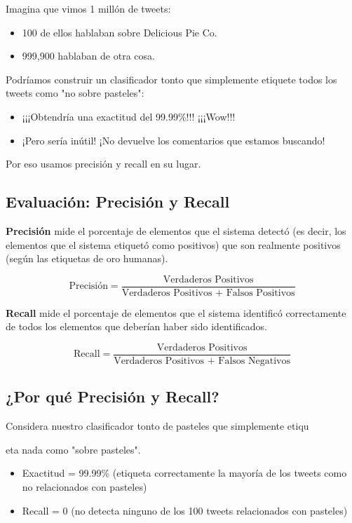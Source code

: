 \documentclass[11pt,fleqn]{book} %
\begin{document}
Imagina que vimos 1 millón de tweets:
\begin{itemize}
\item 100 de ellos hablaban sobre Delicious Pie Co.
\item 999,900 hablaban de otra cosa.
\end{itemize}

Podríamos construir un clasificador tonto que simplemente etiquete todos los tweets como "no sobre pasteles":
\begin{itemize}
\item ¡¡¡Obtendría una exactitud del 99.99\%!!! ¡¡¡Wow!!!
\item ¡Pero sería inútil! ¡No devuelve los comentarios que estamos buscando!
\end{itemize}

Por eso usamos precisión y recall en su lugar.

\subsection{Evaluación: Precisión y Recall}
\textbf{Precisión} mide el porcentaje de elementos que el sistema detectó (es decir, los elementos que el sistema etiquetó como positivos) que son realmente positivos (según las etiquetas de oro humanas).

\[
\text{Precisión} = \frac{\text{Verdaderos Positivos}}{\text{Verdaderos Positivos + Falsos Positivos}}
\]

\textbf{Recall} mide el porcentaje de elementos que el sistema identificó correctamente de todos los elementos que deberían haber sido identificados.

\[
\text{Recall} = \frac{\text{Verdaderos Positivos}}{\text{Verdaderos Positivos + Falsos Negativos}}
\]

\subsection{¿Por qué Precisión y Recall?}
Considera nuestro clasificador tonto de pasteles que simplemente etiqu

eta nada como "sobre pasteles".

\begin{itemize}
  \item Exactitud = 99.99\% (etiqueta correctamente la mayoría de los tweets como no relacionados con pasteles)
  \item Recall = 0 (no detecta ninguno de los 100 tweets relacionados con pasteles)
\end{itemize}
\end{document}
